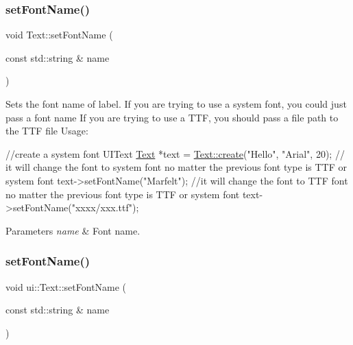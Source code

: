 \subsubsection{\texorpdfstring{set\+Font\+Name()}{setFontName()}\hspace{0.1cm}{\footnotesize\ttfamily [1/2]}}
{\footnotesize\ttfamily void Text\+::set\+Font\+Name (\begin{DoxyParamCaption}\item[{const std\+::string \&}]{name }\end{DoxyParamCaption})}

Sets the font name of label. If you are trying to use a system font, you could just pass a font name If you are trying to use a T\+TF, you should pass a file path to the T\+TF file Usage\+: 
\begin{DoxyCode}
 \textcolor{comment}{//create a system font UIText}
\hyperlink{classText}{Text} *text = \hyperlink{classui_1_1Text_aafdd02d8f0b256cb4997ada4f146e2c2}{Text::create}(\textcolor{stringliteral}{"Hello"}, \textcolor{stringliteral}{"Arial"}, 20);
\textcolor{comment}{// it will change the font to system font no matter the previous font type is TTF or system font}
text->setFontName(\textcolor{stringliteral}{"Marfelt"});
\textcolor{comment}{//it will change the font to TTF font no matter the previous font type is TTF or system font}
text->setFontName(\textcolor{stringliteral}{"xxxx/xxx.ttf"});
\end{DoxyCode}
 
\begin{DoxyParams}{Parameters}
{\em name} & Font name. \\
\hline
\end{DoxyParams}
\mbox{\label{classui_1_1Text_abb05f9c986458b8c5e4e29c82c1628c2}} 
\subsubsection{\texorpdfstring{set\+Font\+Name()}{setFontName()}\hspace{0.1cm}{\footnotesize\ttfamily [2/2]}}
{\footnotesize\ttfamily void ui\+::\+Text\+::set\+Font\+Name (\begin{DoxyParamCaption}\item[{const std\+::string \&}]{name }\end{DoxyParamCaption})}

